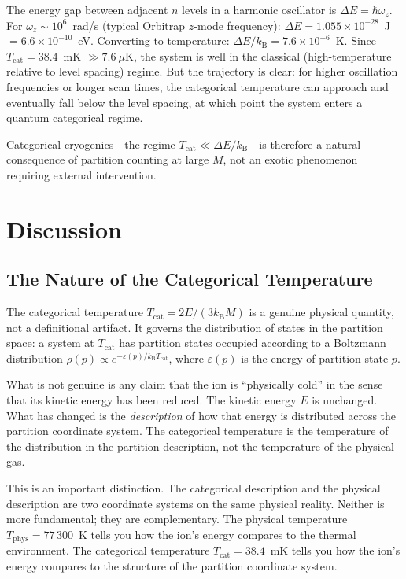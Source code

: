 \documentclass[twocolumn,10pt]{article}
\newcommand{\kB}{k_{\mathrm{B}}}
\newcommand{\Tcat}{T_{\mathrm{cat}}}
\newcommand{\Tphys}{T_{\mathrm{phys}}}
\begin{document}
The energy gap between adjacent $n$ levels in a harmonic oscillator is $\Delta E = \hbar\omega_z$. For $\omega_z \sim 10^6$~rad/s (typical Orbitrap $z$-mode frequency): $\Delta E = 1.055 \times 10^{-28}$~J $= 6.6 \times 10^{-10}$~eV. Converting to temperature: $\Delta E/\kB = 7.6 \times 10^{-6}$~K. Since $\Tcat = 38.4$~mK $\gg 7.6~\mu$K, the system is well in the classical (high-temperature relative to level spacing) regime. But the trajectory is clear: for higher oscillation frequencies or longer scan times, the categorical temperature can approach and eventually fall below the level spacing, at which point the system enters a quantum categorical regime.

Categorical cryogenics---the regime $\Tcat \ll \Delta E/\kB$---is therefore a natural consequence of partition counting at large $M$, not an exotic phenomenon requiring external intervention.

\section{Discussion}
\label{sec:discussion}

\subsection{The Nature of the Categorical Temperature}

The categorical temperature $\Tcat = 2E/(3\kB M)$ is a genuine physical quantity, not a definitional artifact. It governs the distribution of states in the partition space: a system at $\Tcat$ has partition states occupied according to a Boltzmann distribution $\rho(p) \propto e^{-\varepsilon(p)/\kB\Tcat}$, where $\varepsilon(p)$ is the energy of partition state $p$.

What is not genuine is any claim that the ion is ``physically cold'' in the sense that its kinetic energy has been reduced. The kinetic energy $E$ is unchanged. What has changed is the \emph{description} of how that energy is distributed across the partition coordinate system. The categorical temperature is the temperature of the distribution in the partition description, not the temperature of the physical gas.

This is an important distinction. The categorical description and the physical description are two coordinate systems on the same physical reality. Neither is more fundamental; they are complementary. The physical temperature $\Tphys = 77\,300$~K tells you how the ion's energy compares to the thermal environment. The categorical temperature $\Tcat = 38.4$~mK tells you how the ion's energy compares to the structure of the partition coordinate system.
\end{document}
